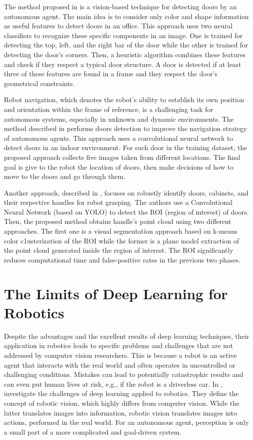  The method proposed in \cite{detectdoorsfeature} is a vision-based technique for detecting doors by an autonomous agent. The main idea is to consider only color and shape information as useful features to detect doors in an office. This approach uses two neural classifiers to recognize these specific components in an image. One is trained for detecting the top, left, and the right bar of the door while the other is trained for detecting the door's corners. Then, a heuristic algorithm combines these features and check if they respect a typical door structure. A door is detected if at least three of these features are found in a frame and they respect the door's geometrical constraints. 
 
 Robot navigation, which denotes the robot's ability to establish its own position and orientation within the frame of reference, is a challenging task for autonomous systems, especially in unknown and dynamic environments. The method described in \cite{doorsandnavigation} performs doors detection to improve the navigation strategy of autonomous agents. This approach uses a convolutional neural network to detect doors in an indoor environment. For each door in the training dataset, the proposed approach collects five images taken from different locations. The final goal is give to the robot the location of doors, then make decisions of how to move to the doors and go through them.
 
 Another approach, described in \cite{doorcabinet}, focuses on robustly identify doors, cabinets, and their respective handles for robot grasping. The authors use a Convolutional Neural Network (based on YOLO) to detect the ROI (region of interest) of doors. Then, the proposed method obtains handle's point cloud using two different approaches. The first one is a visual segmentation approach based on k-means color c1usterization of the ROI while the former is a plane model extraction of the point cloud generated inside the region of interest. The ROI significantly reduces computational time and false-positive rates in the previous two phases.
 
 \section{The Limits of Deep Learning for Robotics}
 
 Despite the advantages and the excellent results of deep learning techniques, their application in robotics leads to specific problems and challenges that are not addressed by computer vision researchers. This is because a robot is an active agent that interacts with the real world and often operates in uncontrolled or challenging conditions. Mistakes can lead to potentially catastrophic results and can even put human lives at risk, e.g., if the robot is a driverless car. In \cite{surveydeeplimits}, \citeauthor{surveydeeplimits} investigate the challenges of deep learning applied to robotics. They define the concept of robotic vision, which highly differs from computer vision. While the latter translates images into information, robotic vision translates images into actions, performed in the real world. For an autonomous agent, perception is only a small part of a more complicated and goal-driven system. 
 
